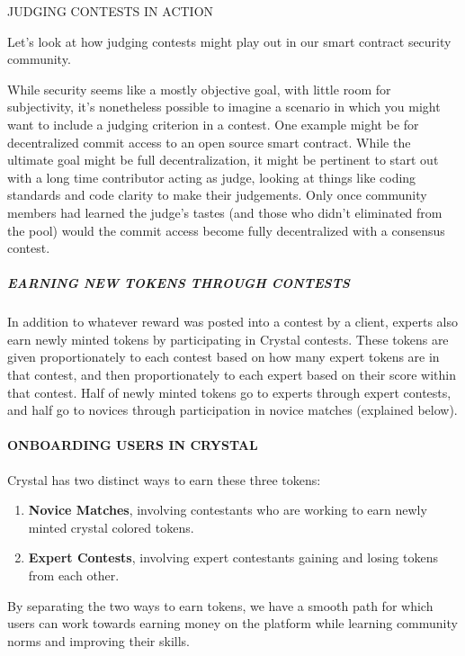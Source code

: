JUDGING CONTESTS IN ACTION

Let's look at how judging contests might play out in our smart contract
security community.

While security seems like a mostly objective goal, with little room for
subjectivity, it's nonetheless possible to imagine a scenario in which
you might want to include a judging criterion in a contest. One example
might be for decentralized commit access to an open source smart
contract. While the ultimate goal might be full decentralization, it
might be pertinent to start out with a long time contributor acting as
judge, looking at things like coding standards and code clarity to make
their judgements. Only once community members had learned the judge's
tastes (and those who didn't eliminated from the pool) would the commit
access become fully decentralized with a consensus contest.

\subparagraph{EARNING NEW TOKENS THROUGH
CONTESTS}\label{earning-new-tokens-through-contests}

In addition to whatever reward was posted into a contest by a client,
experts also earn newly minted tokens by participating in Crystal
contests. These tokens are given proportionately to each contest based
on how many expert tokens are in that contest, and then proportionately
to each expert based on their score within that contest. Half of newly
minted tokens go to experts through expert contests, and half go to
novices through participation in novice matches (explained below).

\paragraph{ONBOARDING USERS IN
CRYSTAL}\label{onboarding-users-in-crystal}

Crystal has two distinct ways to earn these three tokens:

\begin{enumerate}
\def\labelenumi{\arabic{enumi}.}
\item
  \textbf{Novice Matches}, involving contestants who are working to earn
  newly minted crystal colored tokens.
\item
  \textbf{Expert Contests}, involving expert contestants gaining and
  losing tokens from each other.
\end{enumerate}

By separating the two ways to earn tokens, we have a smooth path for
which users can work towards earning money on the platform while
learning community norms and improving their skills.

